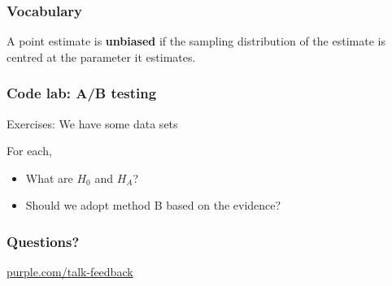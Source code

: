\documentclass[t]{beamer}
\begin{document}
\begin{frame}
  \frametitle{Vocabulary}

  A point estimate is \textbf{unbiased} if the sampling distribution
  of the estimate is centred at the parameter it estimates.


\end{frame}

\begin{frame}
  \frametitle{Code lab: A/B testing}

  Exercises:  We have some data sets

  For each,
  \begin{itemize}
  \item What are $H_0$ and $H_A$?
  \item Should we adopt method B based on the evidence?
  \end{itemize}

\end{frame}

\begin{frame}
  \frametitle{Questions?}
  \vspace{3cm}
  \centerline{\large\url{purple.com/talk-feedback}}
\end{frame}

\end{document}
